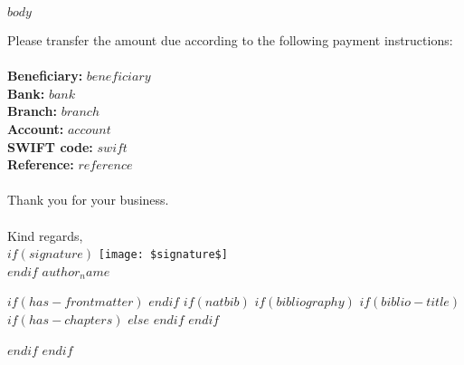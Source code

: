 \documentclass[
  11pt,
  a4paper,
  UKenglish,
  $for(classoption)$
    $classoption$$sep$,
  $endfor$
]{$documentclass$}
\begin{document}
$body$

{\small
    Please transfer the amount due according to the following payment instructions:\\
    \\
    \textbf{Beneficiary: } $beneficiary$\\
    \textbf{Bank:} $bank$\\
    \textbf{Branch:} $branch$\\
    \textbf{Account:} $account$\\
    \textbf{SWIFT code:} $swift$\\
    \textbf{Reference:} $reference$}\\
\\
Thank you for your business.\\
\\
Kind regards,\\
$if(signature)$
\texttt{[image: \$signature\$]}\\
$endif$
$author_name$

\clearpage



\hypertarget{timesheet}{}

$if(has-frontmatter)$
\backmatter
$endif$
$if(natbib)$
$if(bibliography)$
$if(biblio-title)$
$if(has-chapters)$
\renewcommand\bibname{$biblio-title$}
$else$
\renewcommand\refname{$biblio-title$}
$endif$
$endif$

$endif$
$endif$
\end{document}
